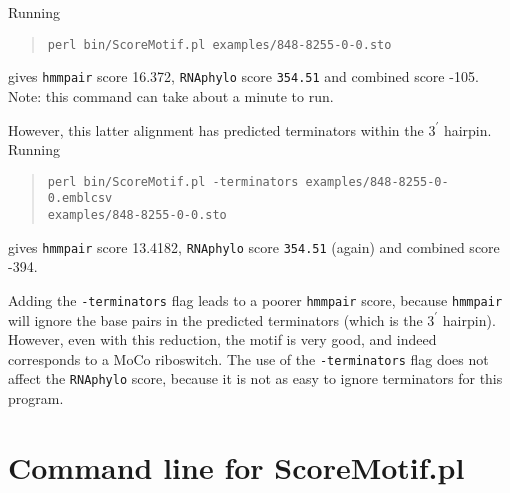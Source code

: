 \documentclass[letterpaper,12pt]{report}
\begin{document}
Running
\begin{quote}
{\tt perl bin/ScoreMotif.pl examples/848-8255-0-0.sto}
\end{quote}
gives {\tt hmmpair} score 16.372, {\tt RNAphylo} score {\tt 354.51} and combined score -105.  Note: this command can take about a minute to run.

However, this latter alignment has predicted terminators within the $3^\prime$ hairpin.  Running
\begin{quote}
{\tt perl bin/ScoreMotif.pl -terminators examples/848-8255-0-0.emblcsv\\examples/848-8255-0-0.sto}
\end{quote}
gives {\tt hmmpair} score 13.4182, {\tt RNAphylo} score {\tt 354.51} (again) and combined score -394.

Adding the {\tt -terminators} flag leads to a poorer {\tt hmmpair} score, because {\tt hmmpair} will ignore the base pairs in the predicted terminators (which is the $3^\prime$ hairpin).  However, even with this reduction, the motif is very good, and indeed corresponds to a MoCo riboswitch.  The use of the {\tt -terminators} flag does not affect the {\tt RNAphylo} score, because it is not as easy to ignore terminators for this program.

\section{Command line for ScoreMotif.pl}
\end{document}
